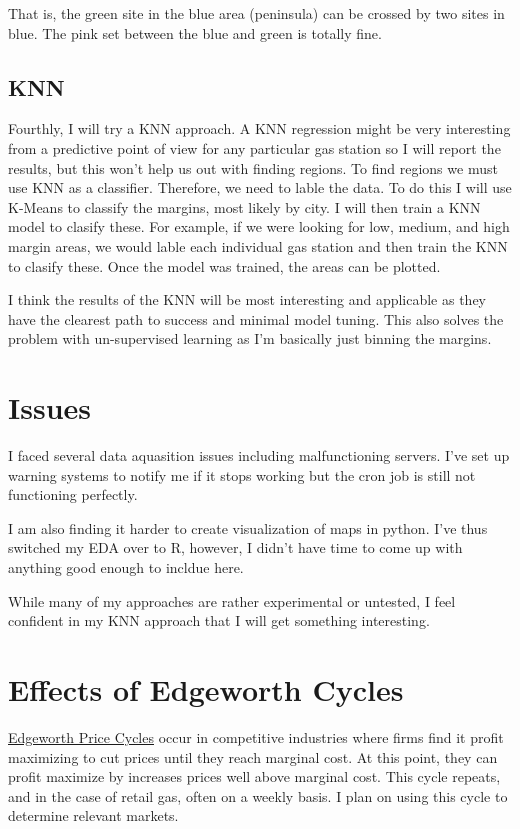 \documentclass[11pt]{article}
\begin{document}
That is, the green site in the blue area (peninsula) can be crossed by two sites
in blue. The pink set between the blue and green is totally fine.


\subsection{KNN}
\label{sec:org6972356}

Fourthly, I will try a KNN approach. A KNN regression might be very interesting
from a predictive point of view for any particular gas station so I will report
the results, but this won't help us out with finding regions. To find regions we
must use KNN as a classifier. Therefore, we need to lable the data. To do this I
will use K-Means to classify the margins, most likely by city. I will then train
a KNN model to clasify these. For example, if we were looking for low, medium,
and high margin areas, we would lable each individual gas station and then train
the KNN to clasify these. Once the model was trained, the areas can be plotted.


I think the results of the KNN will be most interesting and applicable as they
have the clearest path to success and minimal model tuning. This also solves the 
problem with un-supervised learning as I'm basically just binning the margins.

\section{Issues}
\label{sec:org672fee8}

I faced several data aquasition issues including malfunctioning servers. I've
set up warning systems to notify me if it stops working but the cron job is
still not functioning perfectly. 

I am also finding it harder to create visualization of maps in python. I've thus
switched my EDA over to R, however, I didn't have time to come up with anything
good enough to incldue here.

While many of my approaches are rather experimental or untested, I feel confident
in my KNN approach that I will get something interesting. 

\section{Effects of Edgeworth Cycles}
\label{sec:orgf0006e6}

\href{https://en.wikipedia.org/wiki/Edgeworth\_price\_cycle}{Edgeworth Price Cycles} occur in competitive industries where firms find it
profit maximizing to cut prices until they reach marginal cost. At this point,
they can profit maximize by increases prices well above marginal cost. This
cycle repeats, and in the case of retail gas, often on a weekly basis. I plan on
using this cycle to determine relevant markets. 
\end{document}
